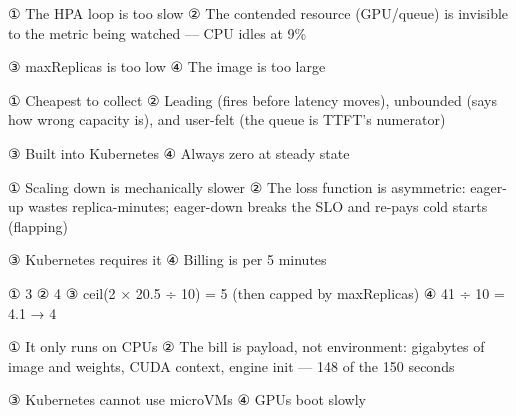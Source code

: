 
\begin{tbboptions}
  \item ① The HPA loop is too slow        ② The contended resource (GPU/queue) is invisible to the metric being watched — CPU idles at 9\%
  \item ③ maxReplicas is too low        ④ The image is too large
\end{tbboptions}


\begin{tbboptions}
  \item ① Cheapest to collect        ② Leading (fires before latency moves), unbounded (says how wrong capacity is), and user-felt (the queue is TTFT's numerator)
  \item ③ Built into Kubernetes        ④ Always zero at steady state
\end{tbboptions}


\begin{tbboptions}
  \item ① Scaling down is mechanically slower        ② The loss function is asymmetric: eager-up wastes replica-minutes; eager-down breaks the SLO and re-pays cold starts (flapping)
  \item ③ Kubernetes requires it        ④ Billing is per 5 minutes
\end{tbboptions}


\begin{tbboptions}
  \item ① 3        ② 4        ③ ceil(2 × 20.5 ÷ 10) = 5 (then capped by maxReplicas)        ④ 41 ÷ 10 = 4.1 → 4
\end{tbboptions}


\begin{tbboptions}
  \item ① It only runs on CPUs        ② The bill is payload, not environment: gigabytes of image and weights, CUDA context, engine init — 148 of the 150 seconds
  \item ③ Kubernetes cannot use microVMs        ④ GPUs boot slowly
\end{tbboptions}

